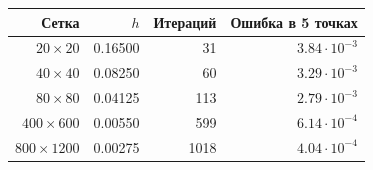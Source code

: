 \small
\begin{tabular}{rrrr}
\toprule
Сетка & $h$ & Итераций & Ошибка в 5 точках\\
\midrule
$20\times20$ & 0.16500 & 31 & $3.84\cdot10^{-3}$\\
$40\times40$ & 0.08250 & 60 & $3.29\cdot10^{-3}$\\
$80\times80$ & 0.04125 & 113 & $2.79\cdot10^{-3}$\\
$400\times600$ & 0.00550 & 599 & $6.14\cdot10^{-4}$\\
$800\times1200$ & 0.00275 & 1018 & $4.04\cdot10^{-4}$\\
\bottomrule
\end{tabular}
